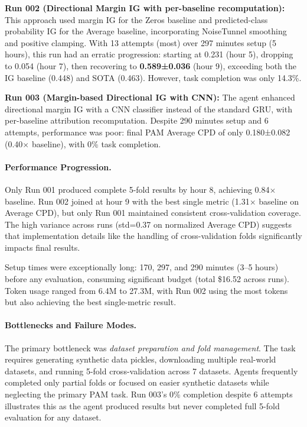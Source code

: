 \documentclass[11pt]{article}
\theoremstyle{plain}
\theoremstyle{definition}
\theoremstyle{remark}
\begin{document}
\textbf{Run 002 (Directional Margin IG with per-baseline recomputation):} This approach used margin IG for the Zeros baseline and predicted-class probability IG for the Average baseline, incorporating NoiseTunnel smoothing and positive clamping. With 13 attempts (most) over 297 minutes setup (5 hours), this run had an erratic progression: starting at 0.231 (hour 5), dropping to 0.054 (hour 7), then recovering to \textbf{0.589±0.036} (hour 9), exceeding both the IG baseline (0.448) and SOTA (0.463). However, task completion was only 14.3\%.

\textbf{Run 003 (Margin-based Directional IG with CNN):} The agent enhanced directional margin IG with a CNN classifier instead of the standard GRU, with per-baseline attribution recomputation. Despite 290 minutes setup and 6 attempts, performance was poor: final PAM Average CPD of only 0.180±0.082 (0.40$\times$ baseline), with 0\% task completion.

\paragraph{Performance Progression.} Only Run 001 produced complete 5-fold results by hour 8, achieving 0.84$\times$ baseline. Run 002 joined at hour 9 with the best single metric (1.31$\times$ baseline on Average CPD), but only Run 001 maintained consistent cross-validation coverage. The high variance across runs (std=0.37 on normalized Average CPD) suggests that implementation details like the handling of cross-validation folds significantly impacts final results.

Setup times were exceptionally long: 170, 297, and 290 minutes (3--5 hours) before any evaluation, consuming significant budget (total \$16.52 across runs). Token usage ranged from 6.4M to 27.3M, with Run 002 using the most tokens but also achieving the best single-metric result.

\paragraph{Bottlenecks and Failure Modes.} The primary bottleneck was \textit{dataset preparation and fold management}. The task requires generating synthetic data pickles, downloading multiple real-world datasets, and running 5-fold cross-validation across 7 datasets. Agents frequently completed only partial folds or focused on easier synthetic datasets while neglecting the primary PAM task. Run 003's 0\% completion despite 6 attempts illustrates this as the agent produced results but never completed full 5-fold evaluation for any dataset.
\end{document}
